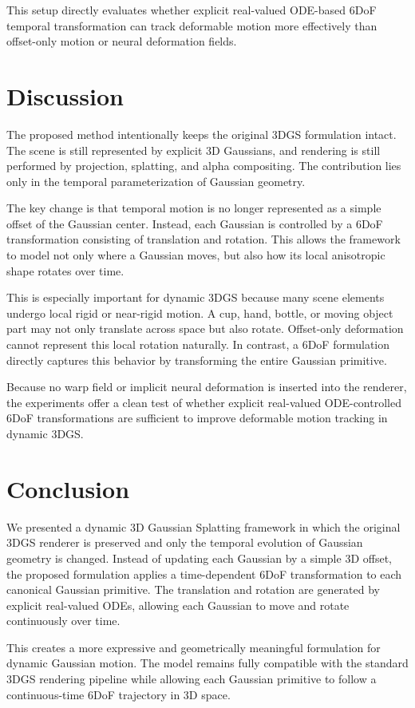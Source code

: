 \documentclass[11pt]{article}
\begin{document}
This setup directly evaluates whether explicit real-valued ODE-based 6DoF temporal transformation can track deformable motion more effectively than offset-only motion or neural deformation fields.

\section{Discussion}

The proposed method intentionally keeps the original 3DGS formulation intact. The scene is still represented by explicit 3D Gaussians, and rendering is still performed by projection, splatting, and alpha compositing. The contribution lies only in the temporal parameterization of Gaussian geometry.

The key change is that temporal motion is no longer represented as a simple offset of the Gaussian center. Instead, each Gaussian is controlled by a 6DoF transformation consisting of translation and rotation. This allows the framework to model not only where a Gaussian moves, but also how its local anisotropic shape rotates over time.

This is especially important for dynamic 3DGS because many scene elements undergo local rigid or near-rigid motion. A cup, hand, bottle, or moving object part may not only translate across space but also rotate. Offset-only deformation cannot represent this local rotation naturally. In contrast, a 6DoF formulation directly captures this behavior by transforming the entire Gaussian primitive.

Because no warp field or implicit neural deformation is inserted into the renderer, the experiments offer a clean test of whether explicit real-valued ODE-controlled 6DoF transformations are sufficient to improve deformable motion tracking in dynamic 3DGS.

\section{Conclusion}

We presented a dynamic 3D Gaussian Splatting framework in which the original 3DGS renderer is preserved and only the temporal evolution of Gaussian geometry is changed. Instead of updating each Gaussian by a simple 3D offset, the proposed formulation applies a time-dependent 6DoF transformation to each canonical Gaussian primitive. The translation and rotation are generated by explicit real-valued ODEs, allowing each Gaussian to move and rotate continuously over time.

This creates a more expressive and geometrically meaningful formulation for dynamic Gaussian motion. The model remains fully compatible with the standard 3DGS rendering pipeline while allowing each Gaussian primitive to follow a continuous-time 6DoF trajectory in 3D space.
\end{document}

